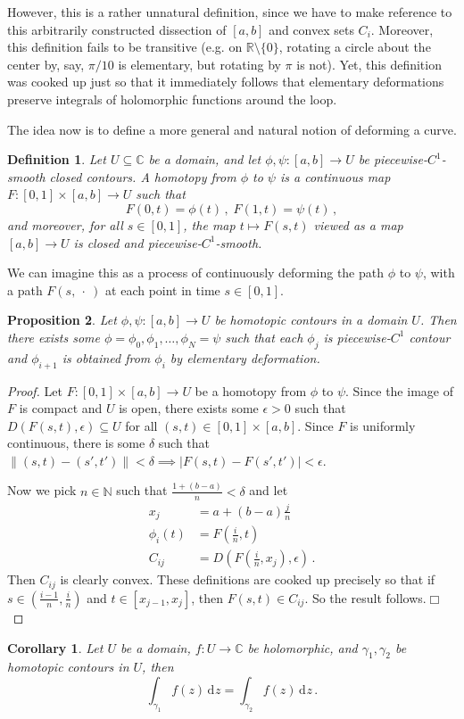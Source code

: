 \documentclass{article}
\theoremstyle{plain}\theoremheaderfont{\normalfont\itshape}\theorembodyfont{\rmfamily}\theoremseparator{.}\newtheorem*{rem}{Remark}\newtheorem*{ex}{Example}\newtheorem*{proof}{Proof}\newtheorem*{altp}{Alternative proof}\newtheorem*{con}{Consequences}\newtheorem*{notn}{Notations}\newtheorem*{cau}{Caution}\newtheorem*{term}{Terminology}\newtheorem*{keyex}{Key example}
\theoremstyle{plain}\theoremheaderfont{\normalfont\bfseries}\theorembodyfont{\rmfamily}\theoremseparator{.}\newtheorem{thm}{Theorem}[section]\newtheorem{lem}[thm]{Lemma}\newtheorem{prop}[thm]{Proposition}\newtheorem*{cor}{Corollary}\newtheorem{defn}[thm]{Definition}\newtheorem{clm}[thm]{Claim}\newtheorem{clminproof}{Claim}\newtheorem{leminproof}{Lemma}\newtheorem{app}{Application}
\theoremstyle{break}\theoremheaderfont{\normalfont\itshape}\theorembodyfont{\rmfamily}\theoremseparator{.\medskip}\newtheorem*{proofskip}{Proof}\newtheorem*{exs}{Examples}\newtheorem*{rems}{Remarks}\newtheorem*{rec}{Recall}\newtheorem*{ppts}{Properties}
\theoremstyle{break}\theoremheaderfont{\normalfont\bfseries}\theorembodyfont{\rmfamily}\theoremseparator{.\medskip}\newtheorem{lemskip}[thm]{Lemma}\newtheorem{defnskip}[thm]{Definition}\newtheorem{propskip}[thm]{Proposition}\newtheorem{thmskip}[thm]{Theorem}
\numberwithin{equation}{section}
\newcommand{\qed}{\hfill\ensuremath{\Box}}
\newcommand{\abs}[1]{\left|#1\right|}
\newcommand{\norm}[1]{\left\|#1\right\|}
\newcommand{\dd}[2][]{\,\mathrm{d}^{#1} #2}
\newcommand{\NN}{\mathbb{N}}
\newcommand{\RR}{\mathbb{R}}
\newcommand{\CC}{\mathbb{C}}
\begin{document}
    However, this is a rather unnatural definition, since we have to make reference to this arbitrarily constructed dissection of \([a,b]\) and convex sets \(C_i\). Moreover, this definition fails to be transitive (e.g. on \(\RR\setminus\{0\}\), rotating a circle about the center by, say, \(\pi/10\) is elementary, but rotating by \(\pi\) is not). Yet, this definition was cooked up just so that it immediately follows that elementary deformations preserve integrals of holomorphic functions around the loop.

    The idea now is to define a more general and natural notion of deforming a curve.

    \begin{defn}
        Let \(U\subseteq\CC\) be a domain, and let \(\phi,\psi:[a,b]\to U\) be piecewise-\(C^1\)-smooth closed contours. A \textit{homotopy} from \(\phi\) to \(\psi\) is a continuous map \(F:[0,1]\times[a,b]\to U\) such that
        \[F(0,t)=\phi(t)\,,\; F(1,t)=\psi(t)\,,\]
        and moreover, for all \(s\in[0,1]\), the map \(t\mapsto F(s,t)\) viewed as a map \([a,b]\to U\) is closed and piecewise-\(C^1\)-smooth. 
    \end{defn}
    We can imagine this as a process of continuously deforming the path \(\phi\) to \(\psi\), with a path \(F(s,\ \cdot \ )\) at each point in time \(s\in[0,1]\).
    \begin{prop}
        Let \(\phi,\psi:[a,b]\to U\) be homotopic contours in a domain \(U\). Then there exists some \(\phi=\phi_0,\phi_1,\dots,\phi_N=\psi\) such that each \(\phi_j\) is piecewise-\(C^1\) contour and \(\phi_{i+1}\) is obtained from \(\phi_i\) by elementary deformation.
    \end{prop}
    \begin{proof}
        Let \(F:[0,1]\times[a,b]\to U\) be a homotopy from \(\phi\) to \(\psi\). Since the image of \(F\) is compact and \(U\) is open, there exists some \(\epsilon>0\) such that \(D(F(s,t),\epsilon)\subseteq U\) for all \((s,t)\in[0,1]\times[a,b]\). Since \(F\) is uniformly continuous, there is some \(\delta\) such that \(\norm{(s,t)-(s',t')}<\delta\implies\abs{F(s,t)-F(s',t')}<\epsilon\).

        Now we pick \(n\in\NN\) such that \(\frac{1+(b-a)}{n}<\delta\) and let
        \begin{align*}
            x_j&=a+(b-a)\frac{j}{n}\\
            \phi_i(t)&=F\left(\frac{i}{n},t\right)\\
            C_{ij}&=D\left(F\left(\frac{i}{n},x_j\right),\epsilon\right)\,.
        \end{align*}
        Then \(C_{ij}\) is clearly convex. These definitions are cooked up precisely so that if \(s\in(\frac{i-1}{n},\frac{i}{n})\) and \(t\in[x_{j-1},x_j]\), then \(F(s,t)\in C_{ij}\). So the result follows.\qed
    \end{proof}
    \begin{cor}
        Let \(U\) be a domain, \(f:U\to\CC\) be holomorphic, and \(\gamma_1,\gamma_2\) be homotopic contours in \(U\), then
        \[\int_{\gamma_1}f(z)\dd{z}=\int_{\gamma_2}f(z)\dd{z}\,.\]
    \end{cor}
\end{document}
